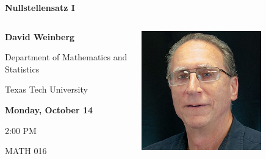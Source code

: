 \documentclass[compress,aspectratio=169]{beamer}
\date{}
\begin{document}
\begin{frame}[fragile]
\centering
\textbf{\huge
Nullstellensatz I}
\vspace{1em}
\begin{columns}
\begin{column}{0.55\textwidth}
\centering
\textbf{
}

\textbf{
\large
David Weinberg
}

Department of Mathematics and Statistics

Texas Tech University

\vspace{2em}
\textbf{
Monday, October 14
}

2:00 PM

MATH 016

\end{column}
\begin{column}{0.45\textwidth}
\centering
\includegraphics[width=0.7\textwidth]{Weinberg_David.jpg}

\end{column}
\end{columns}


\end{frame}
\end{document}
